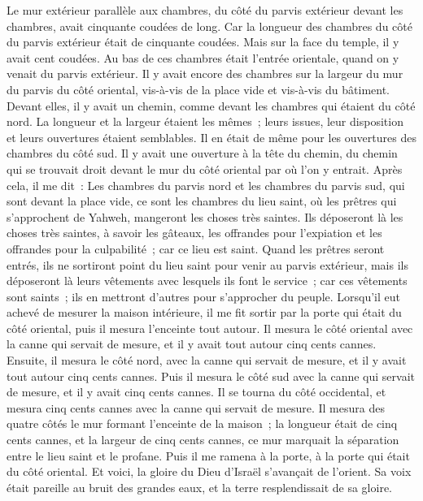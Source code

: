 \begin{multicols}{2}
Le mur extérieur parallèle aux chambres, du côté du parvis extérieur devant les chambres, avait cinquante coudées de long.
Car la longueur des chambres du côté du parvis extérieur était de cinquante coudées. Mais sur la face du temple, il y avait cent coudées.
Au bas de ces chambres était l'entrée orientale, quand on y venait du parvis extérieur.
Il y avait encore des chambres sur la largeur du mur du parvis du côté oriental, vis-à-vis de la place vide et vis-à-vis du bâtiment.
Devant elles, il y avait un chemin, comme devant les chambres qui étaient du côté nord. La longueur et la largeur étaient les mêmes~; leurs issues, leur disposition et leurs ouvertures étaient semblables.
Il en était de même pour les ouvertures des chambres du côté sud. Il y avait une ouverture à la tête du chemin, du chemin qui se trouvait droit devant le mur du côté oriental par où l'on y entrait.
Après cela, il me dit~: Les chambres du parvis nord et les chambres du parvis sud, qui sont devant la place vide, ce sont les chambres du lieu saint, où les prêtres qui s'approchent de Yahweh, mangeront les choses très saintes. Ils déposeront là les choses très saintes, à savoir les gâteaux, les offrandes pour l'expiation et les offrandes pour la culpabilité~; car ce lieu est saint.
Quand les prêtres seront entrés, ils ne sortiront point du lieu saint pour venir au parvis extérieur, mais ils déposeront là leurs vêtements avec lesquels ils font le service~; car ces vêtements sont saints~; ils en mettront d'autres pour s'approcher du peuple.
Lorsqu'il eut achevé de mesurer la maison intérieure, il me fit sortir par la porte qui était du côté oriental, puis il mesura l'enceinte tout autour.
Il mesura le côté oriental avec la canne qui servait de mesure, et il y avait tout autour cinq cents cannes.
Ensuite, il mesura le côté nord, avec la canne qui servait de mesure, et il y avait tout autour cinq cents cannes.
Puis il mesura le côté sud avec la canne qui servait de mesure, et il y avait cinq cents cannes.
Il se tourna du côté occidental, et mesura cinq cents cannes avec la canne qui servait de mesure.
Il mesura des quatre côtés le mur formant l'enceinte de la maison~; la longueur était de cinq cents cannes, et la largeur de cinq cents cannes, ce mur marquait la séparation entre le lieu saint et le profane.
\VerseOne{}Puis il me ramena à la porte, à la porte qui était du côté oriental.
Et voici, la gloire du Dieu d'Israël s'avançait de l'orient. Sa voix était pareille au bruit des grandes eaux, et la terre resplendissait de sa gloire.

\end{multicols}
